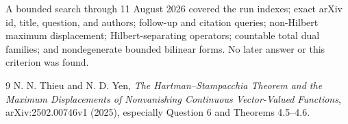 \documentclass[11pt,a4paper]{article}
\begin{document}
A bounded search through 11 August 2026 covered the run indexes; exact arXiv
id, title, question, and authors; follow-up and citation queries; non-Hilbert
maximum displacement; Hilbert-separating operators; countable total dual
families; and nondegenerate bounded bilinear forms.  No later answer or this
criterion was found.

\begin{thebibliography}{9}
N. N. Thieu and N. D. Yen,
\emph{The Hartman--Stampacchia Theorem and the Maximum Displacements of
Nonvanishing Continuous Vector-Valued Functions}, arXiv:2502.00746v1 (2025),
especially Question 6 and Theorems 4.5--4.6.
\end{thebibliography}
\end{document}
